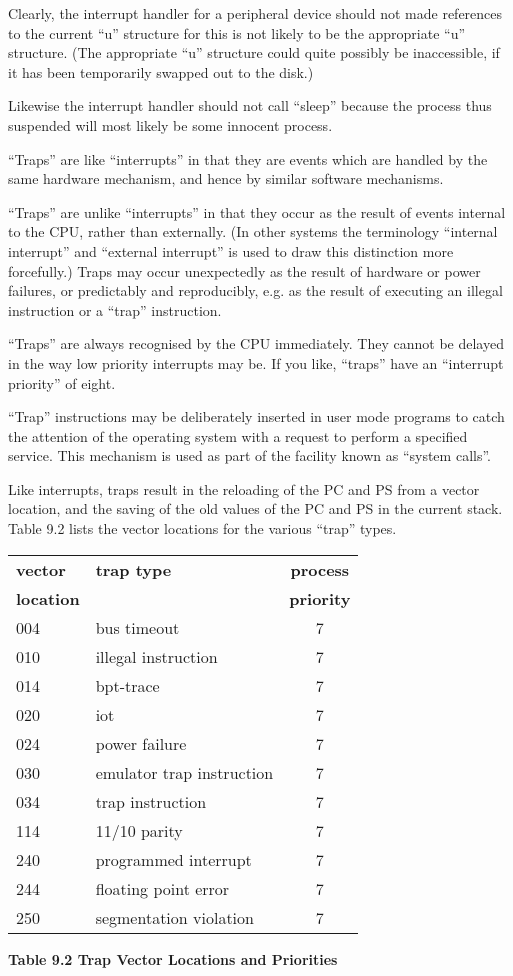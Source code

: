 Clearly, the interrupt handler for a
peripheral device should not made
references to the current ``u'' structure
for this is not likely to be the
appropriate ``u'' structure. (The
appropriate ``u'' structure could quite
possibly be inaccessible, if it has
been temporarily swapped out to the
disk.)

Likewise the interrupt handler should
not call ``sleep'' because the process
thus suspended will most likely be some
innocent process.


``Traps'' are like ``interrupts'' in that
they are events which are handled by
the same hardware mechanism, and hence
by similar software mechanisms.

``Traps'' are unlike ``interrupts'' in that
they occur as the result of events
internal to the CPU, rather than externally. (In other systems the
terminology ``internal interrupt'' and ``external
interrupt'' is used to draw this distinction more forcefully.) Traps may
occur unexpectedly as the result of
hardware or power failures, or predictably and reproducibly, e.g. as the
result of executing an illegal instruction or a ``trap'' instruction.


``Traps'' are always recognised by the
CPU immediately. They cannot be delayed
in the way low priority interrupts may
be. If you like, ``traps'' have an
``interrupt priority'' of eight.

``Trap'' instructions may be deliberately
inserted in user mode programs to catch
the attention of the operating system
with a request to perform a specified
service. This mechanism is used as part
of the facility known as ``system
calls''.

Like interrupts, traps result in the
reloading of the PC and PS from a vector location, and the saving of the old
values of the PC and PS in the current
stack. Table 9.2 lists the vector locations for the various ``trap'' types.

\begin{center}
\begin{tabular}{llc}
{\bf vector} & {\bf trap type} & {\bf process} \\
{\bf location} & & {\bf priority} \\ \hline
004 & bus timeout & 7 \\
010 & illegal instruction & 7 \\
014 & bpt-trace & 7 \\
020 & iot & 7 \\
024 & power failure & 7 \\
030 & emulator trap instruction & 7 \\
034 & trap instruction & 7 \\
114 & 11/10 parity & 7 \\
240 & programmed interrupt & 7 \\
244 & floating point error & 7 \\
250 & segmentation violation & 7 \\
\end{tabular}
\bigskip

{\bf Table 9.2 Trap Vector Locations and Priorities}
\end{center}


